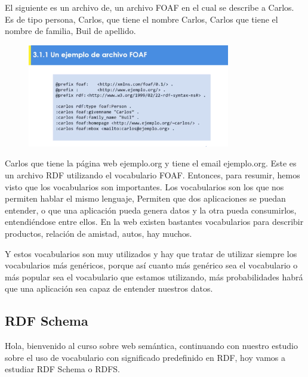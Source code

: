 El siguiente es un archivo de, un archivo FOAF en el cual se describe a Carlos. Es de tipo persona, Carlos, que tiene el nombre Carlos, Carlos que tiene el nombre de familia, Buil de apellido.

\begin{figure}[H]
	\centering
	\includegraphics[height=4.5cm]{imagenes/capitulo3/21} 
	\caption{}
	\label{}
\end{figure}

Carlos que tiene la página web ejemplo.org y tiene el email ejemplo.org. Este es un archivo RDF utilizando el vocabulario FOAF. Entonces, para resumir, hemos visto que los vocabularios son importantes. Los vocabularios son los que nos permiten hablar el mismo lenguaje, Permiten que dos aplicaciones se puedan entender, o que una aplicación pueda genera datos y la otra pueda consumirlos, entendiéndose entre ellos. En la web existen bastantes vocabularios para describir productos, relación de amistad, autos, hay muchos.

Y estos vocabularios son muy utilizados y hay que tratar de utilizar siempre los vocabularios más genéricos, porque así cuanto más genérico sea el vocabulario o más popular sea el vocabulario que estamos utilizando, más probabilidades habrá que una aplicación sea capaz de entender nuestros datos.

\subsection{RDF Schema}

Hola, bienvenido al curso sobre web semántica, continuando con nuestro estudio sobre el uso de vocabulario con significado predefinido en RDF, hoy vamos a estudiar RDF Schema o RDFS.

